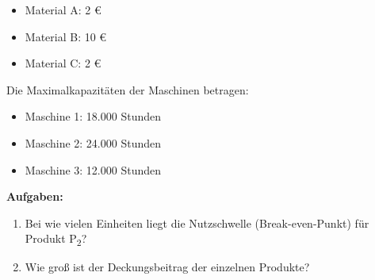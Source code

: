 {\begin{itemize}
    \item Material A: 2 €
    \item Material B: 10 €
    \item Material C: 2 €
\end{itemize}
\noindent
Die Maximalkapazitäten der Maschinen betragen:
\begin{itemize}
    \item Maschine 1: 18.000 Stunden
    \item Maschine 2: 24.000 Stunden
    \item Maschine 3: 12.000 Stunden
\end{itemize}
\noindent
\textbf{Aufgaben:}
\begin{enumerate}[label=\alph*)]
    \item Bei wie vielen Einheiten liegt die Nutzschwelle (Break-even-Punkt) für Produkt P\textsubscript{2}?
    \item Wie groß ist der Deckungsbeitrag der einzelnen Produkte?
\end{enumerate}
}

